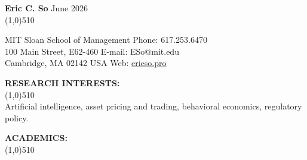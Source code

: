 \documentclass[11pt]{article}
\begin{document}
\setlength{\parindent}{0in}
{\bf \LARGE Eric C. So}  \hfill June 2026\\
\vskip -0.8cm \line(1,0){510} \\ \vskip -0.35cm

MIT Sloan School of Management  \hfill Phone:  617.253.6470\\            
100 Main Street, E62-460    \hfill  E-mail:  ESo@mit.edu\\         
Cambridge, MA  02142 USA \hfill    Web: \href{https://ericso.pro}{ericso.pro}\\
\vskip -0.5cm


\vskip 0.75cm
\setlength{\parindent}{0in}
{\bf RESEARCH INTERESTS:\\}
\vskip -0.85cm \line(1,0){510} \\
\setlength{\parindent}{0.5in}
Artificial intelligence, asset pricing and trading, behavioral economics, regulatory policy.

\vskip 0.75cm
\setlength{\parindent}{0in}
{\bf ACADEMICS:\\}
\vskip -0.85cm \line(1,0){510} \\ \vskip -0.5cm
\end{document}
